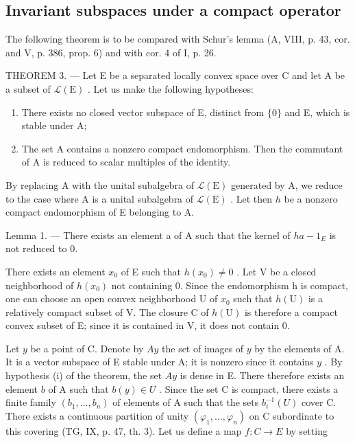 \subsection{Invariant subspaces under a compact operator}

The following theorem is to be compared with Schur's lemma (A, VIII, p. 43, cor. and V, p. 386, prop. 6) and with cor. 4 of I, p. 26.

THEOREM 3. --- Let E be a separated locally convex space over C and let A be a subset of \(\mathcal{L}(\mathrm{E})\) . Let us make the following hypotheses:

\begin{enumerate}
\def\labelenumi{(\roman{enumi})}
\item
  There exists no closed vector subspace of E, distinct from \(\{0\}\) and E, which is stable under A;
\item
  The set A contains a nonzero compact endomorphism. Then the commutant of A is reduced to scalar multiples of the identity.
\end{enumerate}

By replacing A with the unital subalgebra of \(\mathcal{L}(\mathrm{E})\) generated by A, we reduce to the case where A is a unital subalgebra of \(\mathcal{L}(\mathrm{E})\) . Let then \(h\) be a nonzero compact endomorphism of E belonging to A.

Lemma 1. --- There exists an element a of A such that the kernel of \(ha - 1_{E}\) is not reduced to 0.

There exists an element \(x_{0}\) of E such that \(h(x_{0}) \neq 0\) . Let V be a closed neighborhood of \(h(x_{0})\) not containing 0. Since the endomorphism h is compact, one can choose an open convex neighborhood U of \(x_{0}\) such that \(h(\mathrm{U})\) is a relatively compact subset of V. The closure C of \(h(\mathrm{U})\) is therefore a compact convex subset of E; since it is contained in V, it does not contain 0.

Let \(y\) be a point of C. Denote by \(Ay\) the set of images of \(y\) by the elements of A. It is a vector subspace of E stable under A; it is nonzero since it contains \(y\) . By hypothesis (i) of the theorem, the set \(Ay\) is dense in E. There therefore exists an element \(b\) of A such that \(b(y) \in U\) . Since the set C is compact, there exists a finite family \((b_1, \ldots, b_n)\) of elements of A such that the sets \(b_i^{-1}(U)\) cover C. There exists a continuous partition of unity \((\varphi_1, \ldots, \varphi_n)\) on C subordinate to this covering (TG, IX, p. 47, th. 3). Let us define a map \(f: C \to E\) by setting

